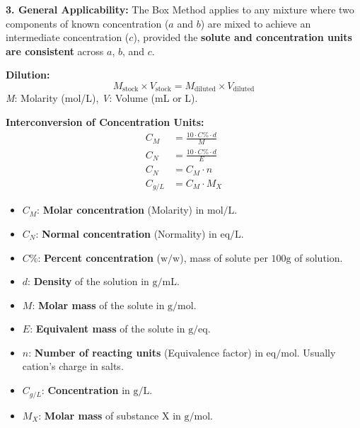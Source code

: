 \vspace{5mm}

\textbf{3. General Applicability:}
The Box Method applies to any mixture where two components of known concentration ($a$ and $b$) are mixed to achieve an intermediate concentration ($c$), provided the \textbf{solute and concentration units are consistent} across $a$, $b$, and $c$.

\vspace{5mm}
\textbf{Dilution:}
\begin{equation}
M_{\text{stock}} \times V_{\text{stock}} = M_{\text{diluted}} \times V_{\text{diluted}}
\end{equation}
\textit{M}: Molarity (mol/L), \textit{V}: Volume (mL or L).

\vspace{5mm}

\textbf{Interconversion of Concentration Units:}
\begin{align}
C_M &= \frac{10 \cdot C\% \cdot d}{M} \tag{1} \\
C_N &= \frac{10 \cdot C\% \cdot d}{E} \tag{2} \\
C_N &= C_M \cdot n \tag{3} \\
C_{g/L} &= C_M \cdot M_X \tag{4}
\end{align}

\noindent
\begin{itemize}
    \item $C_M$: \textbf{Molar concentration} (Molarity) in $\text{mol/L}$.
    \item $C_N$: \textbf{Normal concentration} (Normality) in $\text{eq/L}$.
    \item $C\%$: \textbf{Percent concentration} ($\text{w/w}$), mass of solute per $100\text{g}$ of solution.
    \item $d$: \textbf{Density} of the solution in $\text{g/mL}$.
    \item $M$: \textbf{Molar mass} of the solute in $\text{g/mol}$.
    \item $E$: \textbf{Equivalent mass} of the solute in $\text{g/eq}$.
    \item $n$: \textbf{Number of reacting units} (Equivalence factor) in $\text{eq/mol}$. Usually cation's charge in salts.
    \item $C_{g/L}$: \textbf{Concentration} in $\text{g/L}$.
    \item $M_X$: \textbf{Molar mass} of substance X in $\text{g/mol}$.
\end{itemize}
